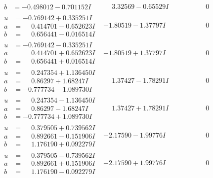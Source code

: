 \documentclass[1p]{elsarticle_modified}
\theoremstyle{definition}
\begin{document}
$$\begin{array}{c|c|c}
\begin{aligned}
b &= -0.498012 - 0.701152 I\end{aligned}
 & \phantom{-}3.32569 - 0.65529 I & \phantom{-0.000000 } 0 \\ \hline\begin{aligned}
u &= -0.769142 + 0.335251 I \\
a &= \phantom{-}0.414701 - 0.652623 I \\
b &= \phantom{-}0.656441 - 0.016514 I\end{aligned}
 & -1.80519 - 1.37797 I & \phantom{-0.000000 } 0 \\ \hline\begin{aligned}
u &= -0.769142 - 0.335251 I \\
a &= \phantom{-}0.414701 + 0.652623 I \\
b &= \phantom{-}0.656441 + 0.016514 I\end{aligned}
 & -1.80519 + 1.37797 I & \phantom{-0.000000 } 0 \\ \hline\begin{aligned}
u &= \phantom{-}0.247354 + 1.136450 I \\
a &= \phantom{-}0.86297 + 1.68247 I \\
b &= -0.777734 - 1.089730 I\end{aligned}
 & \phantom{-}1.37427 - 1.78291 I & \phantom{-0.000000 } 0 \\ \hline\begin{aligned}
u &= \phantom{-}0.247354 - 1.136450 I \\
a &= \phantom{-}0.86297 - 1.68247 I \\
b &= -0.777734 + 1.089730 I\end{aligned}
 & \phantom{-}1.37427 + 1.78291 I & \phantom{-0.000000 } 0 \\ \hline\begin{aligned}
u &= \phantom{-}0.379505 + 0.739562 I \\
a &= \phantom{-}0.892661 - 0.151906 I \\
b &= \phantom{-}1.176190 + 0.092279 I\end{aligned}
 & -2.17590 - 1.99776 I & \phantom{-0.000000 } 0 \\ \hline\begin{aligned}
u &= \phantom{-}0.379505 - 0.739562 I \\
a &= \phantom{-}0.892661 + 0.151906 I \\
b &= \phantom{-}1.176190 - 0.092279 I\end{aligned}
 & -2.17590 + 1.99776 I & \phantom{-0.000000 } 0\\

\end{array}$$
\end{document}
